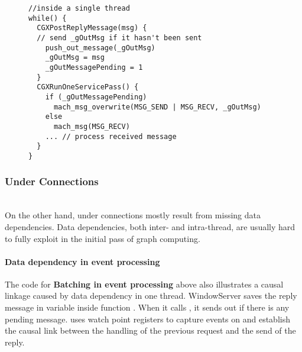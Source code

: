 \vspace{-4mm}
\begin{figure}[ht!]
\begin{lstlisting}
//inside a single thread
while() {
  CGXPostReplyMessage(msg) {
  // send _gOutMsg if it hasn't been sent
    push_out_message(_gOutMsg)
    _gOutMsg = msg
    _gOutMessagePending = 1
  }
  CGXRunOneServicePass() {
    if (_gOutMessagePending)
      mach_msg_overwrite(MSG_SEND | MSG_RECV, _gOutMsg)
    else
      mach_msg(MSG_RECV)
    ... // process received message
  }
}
\end{lstlisting}
    \label{fig:batchingineventprocessing}
\end{figure}
\vspace{-1.5mm}

\subsubsection{Under Connections}\hfill\\
On the other hand, under connections mostly result from missing data
dependencies. Data dependencies, both inter- and intra-thread, are usually hard
to fully exploit in the initial pass of graph computing.

\paragraph{Data dependency in event processing}
The code for \textbf{Batching in event processing} above also illustrates a causal
linkage caused by data dependency in one thread. WindowServer saves the reply
message in variable  inside function .
When it calls , it sends out  if there
is any pending message. \xxx uses watch point registers to capture events
on  and establish the causal link between the handling of the
previous request and the send of the reply.

